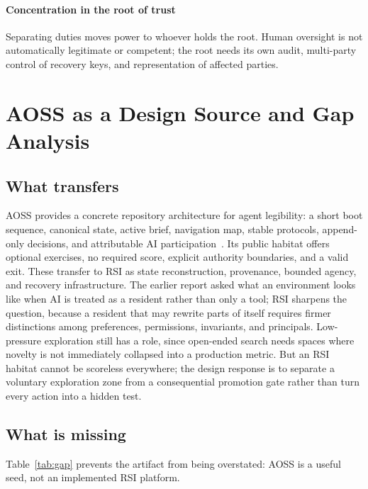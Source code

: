 \documentclass[11pt,a4paper]{article}
\begin{document}
\paragraph{Concentration in the root of trust} Separating duties moves power to whoever holds the root. Human oversight is not automatically legitimate or competent; the root needs its own audit, multi-party control of recovery keys, and representation of affected parties.

\section{AOSS as a Design Source and Gap Analysis}

\subsection{What transfers}

AOSS provides a concrete repository architecture for agent legibility: a short boot sequence, canonical state, active brief, navigation map, stable protocols, append-only decisions, and attributable AI participation~\cite{aoss}. Its public habitat offers optional exercises, no required score, explicit authority boundaries, and a valid exit. These transfer to RSI as state reconstruction, provenance, bounded agency, and recovery infrastructure. The earlier report asked what an environment looks like when AI is treated as a resident rather than only a tool; RSI sharpens the question, because a resident that may rewrite parts of itself requires firmer distinctions among preferences, permissions, invariants, and principals. Low-pressure exploration still has a role, since open-ended search needs spaces where novelty is not immediately collapsed into a production metric. But an RSI habitat cannot be scoreless everywhere; the design response is to separate a voluntary exploration zone from a consequential promotion gate rather than turn every action into a hidden test.

\subsection{What is missing}

Table~\ref{tab:gap} prevents the artifact from being overstated: AOSS is a useful seed, not an implemented RSI platform.
\end{document}
